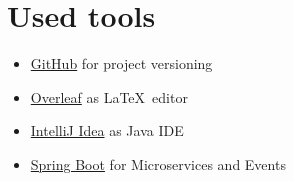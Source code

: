\section{Used tools}
\begin{itemize}
    \item \href{https://github.com/}{GitHub} for project versioning
    \item \href{https://www.overleaf.com}{Overleaf} as \LaTeX\ editor
    \item \href{https://www.jetbrains.com/idea/}{IntelliJ Idea} as Java IDE
    \item \href{https://spring.io/}{Spring Boot} for Microservices and Events
\end{itemize}